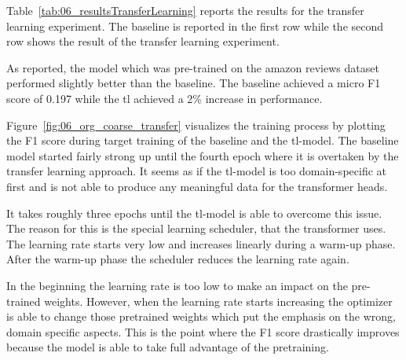 Table~\ref{tab:06_resultsTransferLearning} reports the results for the transfer learning experiment. The baseline is reported in the first row while the second row shows the result of the transfer learning experiment. 
\medskip

As reported, the model which was pre-trained on the amazon reviews dataset performed slightly better than the baseline. The baseline achieved a micro F1 score of 0.197 while the \gls{tl} achieved a 2\% increase in performance. 
\medskip

Figure~\ref{fig:06_org_coarse_transfer} visualizes the training process by plotting the F1 score during target training of the baseline and the \gls{tl}-model. The baseline model started fairly strong up until the fourth epoch where it is overtaken by the transfer learning approach. It seems as if the \gls{tl}-model is too domain-specific at first and is not able to produce any meaningful data for the transformer heads.
\medskip

It takes roughly three epochs until the \gls{tl}-model is able to overcome this issue. The reason for this is the special learning scheduler, that the transformer uses. The learning rate starts very low and increases linearly during a warm-up phase. After the warm-up phase the scheduler reduces the learning rate again.
\medskip

In the beginning the learning rate is too low to make an impact on the pre-trained weights. However, when the learning rate starts increasing the optimizer is able to change those pretrained weights which put the emphasis on the wrong, domain specific aspects. This is the point where the F1 score drastically improves because the model is able to take full advantage of the pretraining.